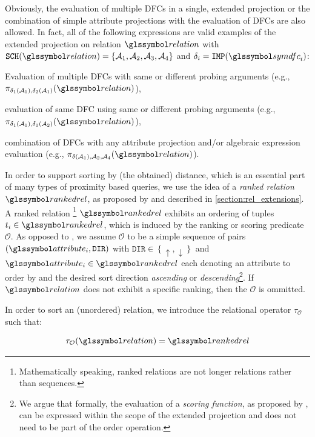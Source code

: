 Obviously, the evaluation of multiple DFCs in a single, extended projection or the combination of simple attribute projections with the evaluation of DFCs are also allowed. In fact, all of the following expressions are valid examples of the extended projection on relation $\relation$ with $\mathtt{SCH}(\relation) = \{ \mathcal{A}_1, \mathcal{A}_2, \mathcal{A}_3, \mathcal{A}_4 \}$ and $\delta_i = \mathtt{IMP}(\symdfc_i)$: 
\begin{enumerate*}[label=(\roman*)]
    \item Evaluation of multiple DFCs with same or different probing arguments (e.g., $\pi_{\delta_1(\mathcal{A}_1), \delta_2(\mathcal{A}_1)}(\relation)$), 
    \item evaluation of same DFC using same or different probing arguments (e.g., $\pi_{\delta_1(\mathcal{A}_1), \delta_1(\mathcal{A}_2)}(\relation)$),
    \item combination of DFCs with any attribute projection and/or algebraic expression evaluation (e.g., $\pi_{\delta(\mathcal{A}_1), \mathcal{A}_2, \mathcal{A}_4}(\relation)$).
\end{enumerate*}

In order to support sorting by (the obtained) distance, which is an essential part of many types of proximity based queries, we use the idea of a \emph{ranked relation} $\rankedrel$, as proposed by \cite{Chengkai:2005RankSQL} and described in \cref{section:rel_extensions}. A ranked relation \footnote{Mathematically speaking, ranked relations are not longer relations rather than sequences.} $\rankedrel$ exhibits an ordering of tuples $t_i \in \rankedrel$, which is induced by the ranking or scoring predicate $\mathcal{O}$. As opposed to \cite{Chengkai:2005RankSQL}, we assume $\mathcal{O}$ to be a simple sequence of pairs $(\attribute_i, \mathtt{DIR})$ with $\mathtt{DIR} \in \left\{ \uparrow, \downarrow \right\}$ and $\attribute_i \in \rankedrel$ each denoting an attribute to order by and the desired sort direction \emph{ascending} or \emph{descending}\footnote{We argue that formally, the evaluation of a \emph{scoring function}, as proposed by \cite{Chengkai:2005RankSQL}, can be expressed within the scope of the extended projection and does not need to be part of the order operation.}. If $\relation$ does not exhibit a specific ranking, then the $\mathcal{O}$ is ommitted.

In order to sort an (unordered) relation, we introduce the relational operator $\tau_{\mathcal{O}}$ such that:

\begin{equation}
    \label{equation:rel_alg_tau}
    \tau_{\mathcal{O}}(\relation) = \rankedrel
\end{equation}


